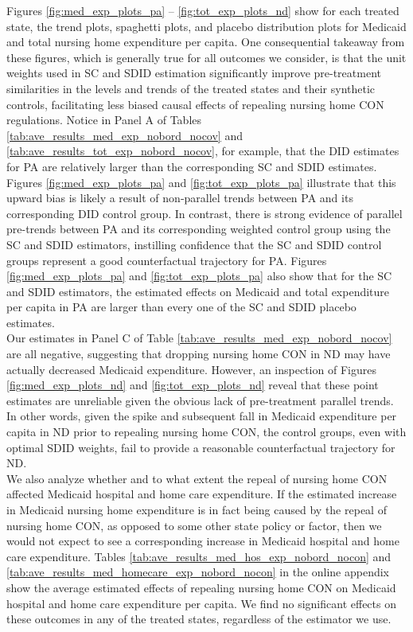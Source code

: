 \documentclass[../Main.tex]{subfiles}
\begin{document}
\indent Figures \ref{fig:med_exp_plots_pa} -- \ref{fig:tot_exp_plots_nd} show for each treated state, the trend plots, spaghetti plots, and placebo distribution plots for Medicaid and total nursing home expenditure per capita. One consequential takeaway from these figures, which is generally true for all outcomes we consider, is that the unit weights used in SC and SDID estimation significantly improve pre-treatment similarities in the levels and trends of the treated states and their synthetic controls, facilitating less biased causal effects of repealing nursing home CON regulations. Notice in Panel A of Tables \ref{tab:ave_results_med_exp_nobord_nocov} and \ref{tab:ave_results_tot_exp_nobord_nocov}, for example, that the DID estimates for PA are relatively larger than the corresponding SC and SDID estimates. Figures \ref{fig:med_exp_plots_pa} and \ref{fig:tot_exp_plots_pa} illustrate that this upward bias is likely a result of non-parallel trends between PA and its corresponding DID control group. In contrast, there is strong evidence of parallel pre-trends between PA and its corresponding weighted control group using the SC and SDID estimators, instilling confidence that the SC and SDID control groups represent a good counterfactual trajectory for PA. Figures \ref{fig:med_exp_plots_pa} and \ref{fig:tot_exp_plots_pa} also show that for the SC and SDID estimators, the estimated effects on Medicaid and total expenditure per capita in PA are larger than every one of the SC and SDID placebo estimates.\\
\indent Our estimates in Panel C of Table \ref{tab:ave_results_med_exp_nobord_nocov} are all negative, suggesting that dropping nursing home CON in ND may have actually decreased Medicaid expenditure. However, an inspection of Figures \ref{fig:med_exp_plots_nd} and \ref{fig:tot_exp_plots_nd} reveal that these point estimates are unreliable given the obvious lack of pre-treatment parallel trends. In other words, given the spike and subsequent fall in Medicaid expenditure per capita in ND prior to repealing nursing home CON, the control groups, even with optimal SDID weights, fail to provide a reasonable counterfactual trajectory for ND. \\
\indent We also analyze whether and to what extent the repeal of nursing home CON affected Medicaid hospital and home care expenditure. If the estimated increase in Medicaid nursing home expenditure is in fact being caused by the repeal of nursing home CON, as opposed to some other state policy or factor, then we would not expect to see a corresponding increase in Medicaid hospital and home care expenditure. Tables \ref{tab:ave_results_med_hos_exp_nobord_nocon} and \ref{tab:ave_results_med_homecare_exp_nobord_nocon} in the online appendix show the average estimated effects of repealing nursing home CON on Medicaid hospital and home care expenditure per capita. We find no significant effects on these outcomes in any of the treated states, regardless of the estimator we use.
\end{document}
